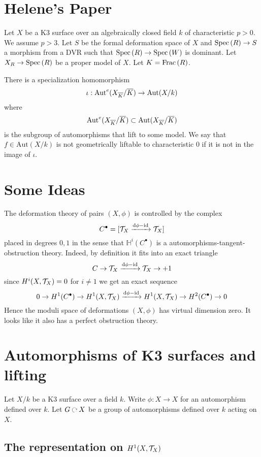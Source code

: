 \documentclass[12pt]{article}
\newcommand{\HH}{\mathbb{H}}
\begin{document}
\section{Helene's Paper}

\renewcommand{\Aut}{\mathrm{Aut}}

Let $X$ be a K3 surface over an algebraically closed field $k$ of characteristic $p > 0$. We assume $p > 3$. Let $S$ be the formal deformation space of $X$ and $\mathrm{Spec}\left( R \right) \to S$ a morphism from a DVR such that $\mathrm{Spec}\left( R \right) \to \mathrm{Spec}\left( W \right)$ is dominant. Let $X_R \to \mathrm{Spec}\left( R \right)$ be a proper model of $X$. Let $K = \mathrm{Frac}\left(R\right)$.
\par 
There is a specialization homomorphism
\[ \iota : \Aut^e(X_{\ol{K}}/\ol{K}) \to \Aut(X/k) \]
where 
\[ \Aut^e(X_{\ol{K}}/\ol{K}) \subset \Aut(X_{\ol{K}}/\ol{K}) \]
is the subgroup of automorphisms that lift to some model. We say that $f \in \Aut(X/k)$ is not geometrically liftable to characteristic $0$ if it is not in the image of $\iota$. 

\section{Some Ideas}

The deformation theory of pairs $(X, \phi)$ is controlled by the complex
\[ C^\bullet = [\mathcal{T}_X \xrightarrow{\mathrm{d}{\phi} - \mathrm{id}} \mathcal{T}_X] \]
placed in degrees $0,1$ in the sense that $\HH^i(C^\bullet)$ is a automorphisms-tangent-obstruction theory. Indeed, by definition it fits into an exact triangle
\[ C \to \mathcal{T}_X \xrightarrow{\mathrm{d}{\phi} - \mathrm{id}} \mathcal{T}_X \to +1 \]
since $H^i(X, \mathcal{T}_X) = 0$ for $i \neq 1$ we get an exact sequence
\[ 0 \to H^1(C^\bullet) \to H^1(X, \mathcal{T}_X) \xrightarrow{\mathrm{d}{\phi} - \mathrm{id}} H^1(X, \mathcal{T}_X) \to H^2(C^\bullet) \to 0 \]
Hence the moduli space of deformations $(X, \phi)$ has virtual dimension zero. It looks like it also has a perfect obstruction theory. 

\section{Automorphisms of K3 surfaces and lifting}

\newcommand{\inner}[2]{\left< #1, #2 \right>}

Let $X / k$ be a K3 surface over a field $k$. Write $\phi : X \to X$ for an automorphism defined over $k$. Let $G \acts X$ be a group of automorphisms defined over $k$ acting on $X$.

\subsection{The representation on $H^1(X, \mathcal{T}_X)$}
\end{document}
